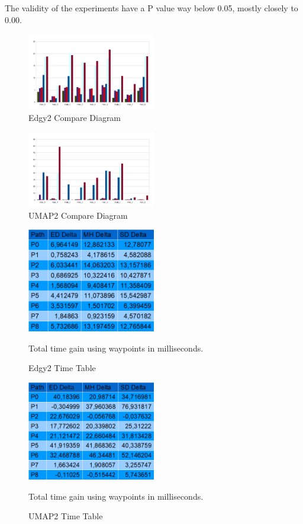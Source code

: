 \documentclass[a4paper]{article}
\begin{document}
{The validity of the experiments have a P value way below 0.05, mostly closely to 0.00.
\begin{figure}[h!]
\centering
\includegraphics[width=0.5\textwidth,height=\textheight,keepaspectratio]{ChartsAndFigures/Edgy2_d2.png}
\caption{Edgy2 Compare Diagram}
\label{fig:Edgy2_d2}
\end{figure}
\begin{figure}[h!]
\centering
\includegraphics[width=0.5\textwidth,height=\textheight,keepaspectratio]{ChartsAndFigures/UMAP2_d2.png}
\caption{UMAP2 Compare Diagram}
\label{fig:UMAP2_d2}
\end{figure}
\begin{figure}[h!]
\centering
\includegraphics[width=0.5\textwidth,height=\textheight,keepaspectratio]{ChartsAndFigures/Edgy2_timeTable.png}
\caption{Edgy2 Time Table}
Total time gain using waypoints in milliseconds.
\label{fig:Edgy2_cd}
\end{figure}
\begin{figure}[h!]
\centering
\includegraphics[width=0.5\textwidth,height=\textheight,keepaspectratio]{ChartsAndFigures/UMAP2_timeTable.png}
\caption{UMAP2 Time Table}
Total time gain using waypoints in milliseconds.
\label{fig:UMAP2_cd}
\end{figure}

}
\end{document}
